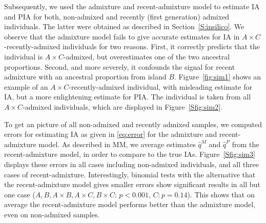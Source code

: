 \documentclass[12pt]{article}
\theoremstyle{definition}
\begin{document}
Subsequently, we used the admixture and recent-admixture model to
estimate IA and PIA for both, non-admixed and recently (first
generation) admixed individuals. The latter were obtained as described
in Section~\ref{S:insilico}. We observe that the admixture model fails
to give accurate estimates for IA in $A\times C$-recently-admixed
individuals for two reasons. First, it correctly predicts that the
individual is $A\times C$-admixed, but overestimates one of the two
ancestral proportions. Second, and more severely, it confounds the
signal for recent admixture with an ancestral proportion from island
$B$.
Figure~\ref{fig:sim1} shows an example of an
$A\times C$-recently-admixed individual, with misleading estimate for
IA, but a more enlightening estimate for PIA. The individual is taken
from all $A\times C$-admixed individuals, which are displayed in
Figure~\ref{Sfig:sim2}.

To get an picture of all non-admixed and recently admixed samples, we
computed errors for estimating IA as given in \eqref{eq:error} for the
admixture and recent-admixture model. As described in MM, we average
estimates $\hat q^M$ and $\hat q^P$ from the recent-admixture model,
in order to compare to the true IAs. Figure~\ref{Sfig:sim3} displays
these errors in all cases including non-admixed individuals, and all
three cases of recent-admixture. Interestingly, binomial tests with
the alternative that the recent-admixture model gives smaller errors
show significant results in all but one case
($A, B, A\times B, A\times C, B\times C$: $p<0.001$, $C:
p=0.14$). This shows that on average the recent-admixture model
performs better than the admixture model, even on non-admixed samples.
\end{document}
